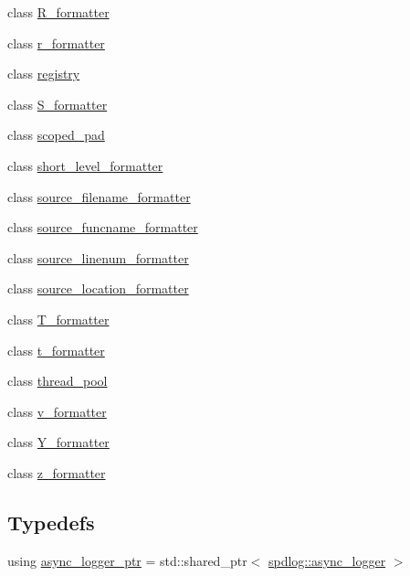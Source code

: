 \begin{DoxyCompactItemize}
\item 
class \hyperlink{classspdlog_1_1details_1_1_r__formatter}{R\+\_\+formatter}
\item 
class \hyperlink{classspdlog_1_1details_1_1r__formatter}{r\+\_\+formatter}
\item 
class \hyperlink{classspdlog_1_1details_1_1registry}{registry}
\item 
class \hyperlink{classspdlog_1_1details_1_1_s__formatter}{S\+\_\+formatter}
\item 
class \hyperlink{classspdlog_1_1details_1_1scoped__pad}{scoped\+\_\+pad}
\item 
class \hyperlink{classspdlog_1_1details_1_1short__level__formatter}{short\+\_\+level\+\_\+formatter}
\item 
class \hyperlink{classspdlog_1_1details_1_1source__filename__formatter}{source\+\_\+filename\+\_\+formatter}
\item 
class \hyperlink{classspdlog_1_1details_1_1source__funcname__formatter}{source\+\_\+funcname\+\_\+formatter}
\item 
class \hyperlink{classspdlog_1_1details_1_1source__linenum__formatter}{source\+\_\+linenum\+\_\+formatter}
\item 
class \hyperlink{classspdlog_1_1details_1_1source__location__formatter}{source\+\_\+location\+\_\+formatter}
\item 
class \hyperlink{classspdlog_1_1details_1_1_t__formatter}{T\+\_\+formatter}
\item 
class \hyperlink{classspdlog_1_1details_1_1t__formatter}{t\+\_\+formatter}
\item 
class \hyperlink{classspdlog_1_1details_1_1thread__pool}{thread\+\_\+pool}
\item 
class \hyperlink{classspdlog_1_1details_1_1v__formatter}{v\+\_\+formatter}
\item 
class \hyperlink{classspdlog_1_1details_1_1_y__formatter}{Y\+\_\+formatter}
\item 
class \hyperlink{classspdlog_1_1details_1_1z__formatter}{z\+\_\+formatter}
\end{DoxyCompactItemize}
\subsection*{Typedefs}
\begin{DoxyCompactItemize}
\item 
using \hyperlink{namespacespdlog_1_1details_a9b6989c16b6150f7e4658ea2aee01bc2}{async\+\_\+logger\+\_\+ptr} = std\+::shared\+\_\+ptr$<$ \hyperlink{classspdlog_1_1async__logger}{spdlog\+::async\+\_\+logger} $>$
\end{DoxyCompactItemize}

